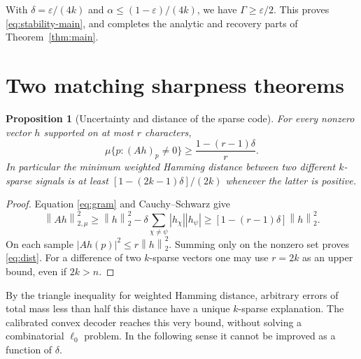 \documentclass[11pt]{article}
\newtheorem{proposition}[theorem]{Proposition}
\theoremstyle{remark}\newtheorem{remark}[theorem]{Remark}
\newcommand{\norm}[1]{\left\|#1\right\|}
\begin{document}
With $\delta=\varepsilon/(4k)$ and $\alpha\le(1-\varepsilon)/(4k)$, we have $\Gamma\ge\varepsilon/2$. This proves \eqref{eq:stability-main}, and completes the analytic and recovery parts of Theorem~\ref{thm:main}.

\section{Two matching sharpness theorems}\label{sec:sharp}
\begin{proposition}[Uncertainty and distance of the sparse code]\label{prop:dist}
For every nonzero vector $h$ supported on at most $r$ characters,
\begin{equation}\label{eq:dist}
 \mu\{p:(Ah)_p\ne0\}\ge\frac{1-(r-1)\delta}{r}.
\end{equation}
In particular the minimum weighted Hamming distance between two different $k$-sparse signals is at least $[1-(2k-1)\delta]/(2k)$ whenever the latter is positive.
\end{proposition}
\begin{proof}
Equation \eqref{eq:gram} and Cauchy--Schwarz give
\[
 \norm{Ah}_{2,\mu}^2\ge \norm h_2^2-\delta\sum_{\chi\ne\psi}|h_\chi||h_\psi|
 \ge[1-(r-1)\delta]\norm h_2^2.
\]
On each sample $|Ah(p)|^2\le r\norm h_2^2$. Summing only on the nonzero set proves \eqref{eq:dist}. For a difference of two $k$-sparse vectors one may use $r=2k$ as an upper bound, even if $2k>n$.
\end{proof}
By the triangle inequality for weighted Hamming distance, arbitrary errors of total mass less than half this distance have a unique $k$-sparse explanation. The calibrated convex decoder reaches this very bound, without solving a combinatorial $\ell_0$ problem. In the following sense it cannot be improved as a function of $\delta$.
\end{document}
